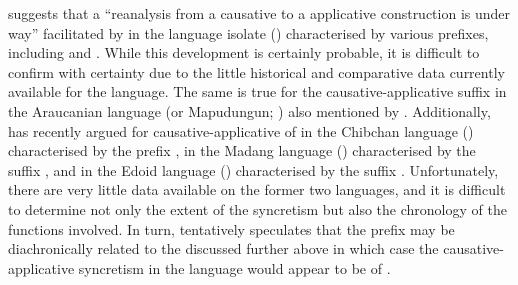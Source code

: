 \citet[12]{malchukov:2017} suggests that a “reanalysis from a causative to a  applicative construction is under way” facilitated by  in the language isolate  () characterised by various prefixes, including  and . While this development is certainly probable, it is difficult to confirm with certainty due to the little historical and comparative data currently available for the language. The same is true for the causative-applicative suffix  in the Araucanian language  (or Mapudungun; ) also mentioned by \citet[9]{malchukov:2017}. Additionally, \citet{van-gysel:2018} has recently argued for cau\-sa\-tive-ap\-pli\-ca\-tive of  in the Chibchan language  () characterised by the prefix , in the Madang language  () characterised by the suffix , and in the Edoid language  () characterised by the suffix . Unfortunately, there are very little data available on the former two languages, and it is difficult to determine not only the extent of the syncretism but also the chronology of the functions involved. In turn, \citeauthor{van-gysel:2018} tentatively speculates that the  prefix may be diachronically related to the   discussed further above in which case the causative-applicative syncretism in the language would appear to be of  \citep{hyman:2007}.


